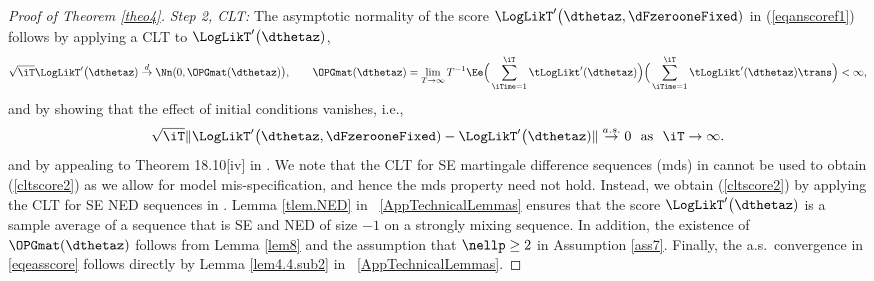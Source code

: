 \begin{proof}[Proof of Theorem \ref{theo4}]
\textit{Step 2, CLT:}
The asymptotic normality of the score $\LogLikT'\big(\dthetaz,\dFzerooneFixed)$ in (\ref{eqanscoref1}) follows by  applying a CLT to $\LogLikT'\big(\dthetaz)$,
\begin{equation}
    \label{cltscore2}
    \sqrt{\iT}\LogLikT'\big(\dthetaz) \stackrel{d}{\to} 
    \Nn(0,\OPGmat(\dthetaz)\big),
	\qquad
	\OPGmat(\dthetaz) = 
\lim_{T \to \infty} T^{-1} \Ee \Big( \sum_{\iTime=1}^{\iT}\tLogLikt'(\dthetaz) \Big) \Big( \sum_{\iTime=1}^{\iT} \tLogLikt'(\dthetaz)\trans \Big) < \infty,
\end{equation}
and by showing that the effect of initial conditions vanishes, i.e.,
\begin{equation}
    \label{eqeasscore}
\sqrt{\iT} \| \LogLikT'\big(\dthetaz,\dFzerooneFixed) -  \LogLikT'\big(\dthetaz) \| \stackrel{a.s.}{\to} 0  \ \text{ as } \ \iT \to \infty.
\end{equation}
and by appealing to Theorem 18.10{\small[iv]} in \citet{citeulike:556271}. 
We note that the CLT for SE martingale difference sequences (mds) in \citet{bil1961} cannot be used to obtain (\ref{cltscore2}) as  we allow for model mis-specification, and hence the mds property need not hold. Instead, we obtain (\ref{cltscore2}) by applying the CLT for SE NED sequences in \citet{RePEc:cup:etheor:v:8:y:1992:i:03:p:313-329_01,RePEc:cup:etheor:v:9:y:1993:i:03:p:402-412_00} \citep[see also][]{davidson1994,potscherprucha1997}. Lemma \ref{tlem.NED} in \SupplementaryAppendix\ \ref{AppTechnicalLemmas} ensures that the score $\LogLikT'\big(\dthetaz)$ is a sample average of a sequence that is SE and NED  of size $-1$ on a strongly mixing sequence. In addition, the existence of $\OPGmat(\dthetaz)$ follows from Lemma \ref{lem8} and the assumption that $\nellp\geq 2$ in Assumption \ref{ass7}.
Finally, the a.s.~convergence in \eqref{eqeasscore} follows directly by Lemma \ref{lem4.4.sub2} in \SupplementaryAppendix\ \ref{AppTechnicalLemmas}.




\end{proof}
